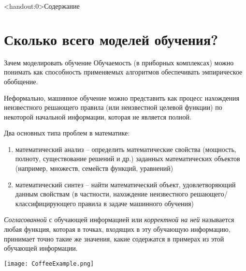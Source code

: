 \documentclass[pdf, intlimits, 9pt, unicode]{beamer}
\title[\disciplineshortname]{\docname}
\begin{document}
\frame{\titlepage}

\begin{frame}<handout:0>{Содержание}\tableofcontents[pausesections]\end{frame}

\section{Сколько всего моделей обучения?}





\begin{frame}{Зачем моделировать обучение}
Обучаемость (в приборных комплексах) можно понимать как способность применяемых алгоритмов обеспечивать {\color{red}эмпирическое обобщение}.\pause

Неформально, машинное обучение можно представить как процесс нахождения неизвестного решающего правила (или неизвестной целевой функции) по некоторой начальной информации, которая не является полной.
\end{frame}




\begin{frame}
Два основных типа проблем в математике:

\begin{enumerate}
\item {\color{red}математический анализ} -- определить математические свойства (мощность, полноту, существование решений и др.) заданных математических объектов (например, множеств, семейств функций, уравнений)\pause
\item {\color{red}математический синтез} -- найти математический объект, удовлетворяющий данным свойствам (в частности, нахождение неизвестного решающего/классифицирующего правила в задаче машинного обучения)
\end{enumerate}


\end{frame}






\begin{frame}
\emph{Согласованной} с обучающей информацией или \emph{корректной на ней} называется любая функция, которая в точках, входящих в эту обучающую информацию, принимает точно такие же значения, какие содержатся в примерах из этой обучающей информации.

\begin{center}\texttt{[image: CoffeeExample.png]}\end{center}

\end{frame}
\end{document}
